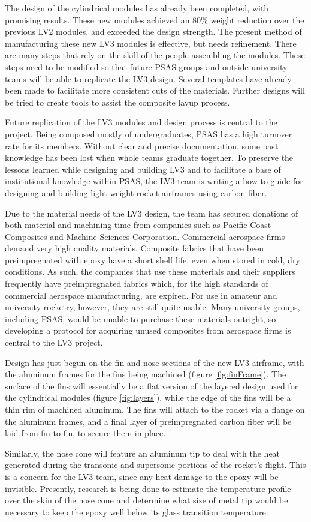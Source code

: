\documentclass{aiaa-tc}%
\begin{document}
The design of the cylindrical modules has already been completed, with promising results. These new modules achieved an 80\% weight reduction over the previous LV2 modules, and exceeded the design strength. 
The present method of manufacturing these new LV3 modules is effective, but needs refinement. There are many steps that rely on the skill of the people assembling the modules. These steps need to be modified so that future PSAS groups and outside university teams will be able to replicate the LV3 design.
Several templates have already been made to facilitate more consistent cuts of the materials. Further designs will be tried to create tools to assist the composite layup process. 

Future replication of the LV3 modules and design process is central to the project. Being composed mostly of undergraduates, PSAS has a high turnover rate for its members. Without clear and precise documentation, some past knowledge has been lost when whole teams graduate together. 
To preserve the lessons learned while designing and building LV3 and to facilitate a base of institutional knowledge within PSAS, the LV3 team is writing a how-to guide for designing and building light-weight rocket airframes using carbon fiber.

Due to the material needs of the LV3 design, the team has secured donations of both material and machining time from companies such as Pacific Coast Composites and Machine Sciences Corporation. 
Commercial aerospace firms demand very high quality materials. Composite fabrics that have been preimpregnated with epoxy have a short shelf life, even when stored in cold, dry conditions. As such, the companies that use these materials and their suppliers frequently have  preimpregnated fabrics which, for the high standards of commercial aerospace manufacturing, are expired. 
For use in amateur and university rocketry, however, they are still quite usable. Many university groups, including PSAS, would be unable to purchase these materials outright, so developing a protocol for acquiring unused composites from aerospace firms is central to the LV3 project. 

Design has just begun on the fin and nose sections of the new LV3 airframe, with the aluminum frames for the fins being machined (figure \ref{fig:finFrame}). The surface of the fins will essentially be a flat version of the layered design used for the cylindrical modules (figure \ref{fig:layers}), while the edge of the fins will be a thin rim of machined aluminum. The fins will attach to the rocket via a flange on the aluminum frames, and a final layer of preimpregnated carbon fiber will be laid from fin to fin, to secure them in place. 

Similarly, the nose cone will feature an aluminum tip to deal with the heat generated during the transonic and supersonic portions of the rocket's flight. This is a concern for the LV3 team, since any heat damage to the epoxy will be invisible. 
Presently, research is being done to estimate the temperature profile over the skin of the nose cone and determine what size of metal tip would be necessary to keep the epoxy well below its glass transition temperature.  
\end{document}
